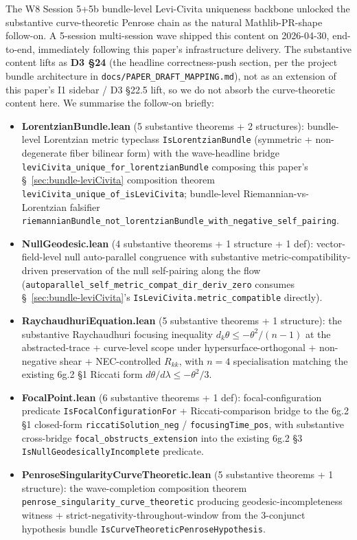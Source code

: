 \documentclass[twocolumn]{revtex4-2}
\begin{document}
The W8 Session 5+5b bundle-level Levi-Civita uniqueness backbone
unlocked the substantive curve-theoretic Penrose chain as the natural
Mathlib-PR-shape follow-on. A 5-session multi-session wave shipped this
content on 2026-04-30, end-to-end, immediately following this paper's
infrastructure delivery. The substantive content lifts as
\textbf{D3 \S 24} (the headline correctness-push section, per the
project bundle architecture in \texttt{docs/PAPER\_DRAFT\_MAPPING.md}),
not as an extension of this paper's I1 sidebar / D3 \S 22.5 lift, so we
do not absorb the curve-theoretic content here. We summarise the
follow-on briefly:
\begin{itemize}
\item \textbf{LorentzianBundle.lean} (5 substantive theorems +
  2 structures): bundle-level Lorentzian metric typeclass
  \texttt{IsLorentzianBundle} (symmetric + non-degenerate fiber
  bilinear form) with the wave-headline bridge
  \texttt{leviCivita\_unique\_for\_lorentzianBundle} composing this
  paper's \S~\ref{sec:bundle-leviCivita} composition theorem
  \texttt{leviCivita\_unique\_of\_isLeviCivita}; bundle-level
  Riemannian-vs-Lorentzian falsifier
  \texttt{riemannianBundle\_not\_lorentzianBundle\_with\_negative\_self\_pairing}.
\item \textbf{NullGeodesic.lean} (4 substantive theorems +
  1 structure + 1 def): vector-field-level null auto-parallel
  congruence with substantive metric-compatibility-driven preservation
  of the null self-pairing along the flow
  (\texttt{autoparallel\_self\_metric\_compat\_dir\_deriv\_zero}
  consumes \S~\ref{sec:bundle-leviCivita}'s \texttt{IsLeviCivita.metric\_compatible}
  directly).
\item \textbf{RaychaudhuriEquation.lean} (5 substantive theorems +
  1 structure): the substantive Raychaudhuri focusing inequality
  $d_{k}\theta \leq -\theta^{2}/(n-1)$ at the abstracted-trace +
  curve-level scope under hypersurface-orthogonal + non-negative shear
  + NEC-controlled $R_{kk}$, with $n=4$ specialisation matching the
  existing 6g.2 \S 1 Riccati form $d\theta/d\lambda \leq -\theta^{2}/3$.
\item \textbf{FocalPoint.lean} (6 substantive theorems + 1 def):
  focal-configuration predicate \texttt{IsFocalConfigurationFor} +
  Riccati-comparison bridge to the 6g.2 \S 1 closed-form
  \texttt{riccatiSolution\_neg} / \texttt{focusingTime\_pos}, with
  substantive cross-bridge \texttt{focal\_obstructs\_extension} into
  the existing 6g.2 \S 3 \texttt{IsNullGeodesicallyIncomplete}
  predicate.
\item \textbf{PenroseSingularityCurveTheoretic.lean} (5 substantive
  theorems + 1 structure): the wave-completion composition theorem
  \texttt{penrose\_singularity\_curve\_theoretic} producing
  geodesic-incompleteness witness + strict-negativity-throughout-window
  from the 3-conjunct hypothesis bundle
  \texttt{IsCurveTheoreticPenroseHypothesis}.
\end{itemize}
\end{document}
